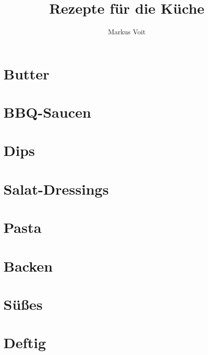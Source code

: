 \documentclass[
  DIV=11,%
  pagesize,%
  fontsize=11pt,%
  paper=a4,%
  numbers=noenddot,
]{scrartcl}
\title{Rezepte für die Küche}
\author{Markus Voit}
\begin{document}
\maketitle
\clearpage

\tableofcontents
\clearpage

\section{Butter}
\newpage
\newpage
\newpage
\newpage
\newpage

\section{BBQ-Saucen}
\newpage
\newpage
\newpage
\newpage
\newpage
\newpage

\section{Dips}
\newpage

\section{Salat-Dressings}
\newpage

\section{Pasta}
\newpage
\newpage

\section{Backen}
\newpage
\newpage

\section{Süßes}
\newpage
\newpage
\newpage

\section{Deftig}
\newpage
\newpage
\end{document}
